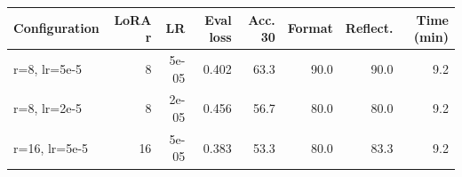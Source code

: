 \begin{tabular}{lrrrrrrr}
\toprule
Configuration & LoRA r & LR & Eval loss & Acc. 30 & Format & Reflect. & Time (min) \\ 
\midrule
r=8, lr=5e-5 & 8 & 5e-05 & 0.402 & 63.3 & 90.0 & 90.0 & 9.2 \\ 
r=8, lr=2e-5 & 8 & 2e-05 & 0.456 & 56.7 & 80.0 & 80.0 & 9.2 \\ 
r=16, lr=5e-5 & 16 & 5e-05 & 0.383 & 53.3 & 80.0 & 83.3 & 9.2 \\ 
\bottomrule
\end{tabular}
